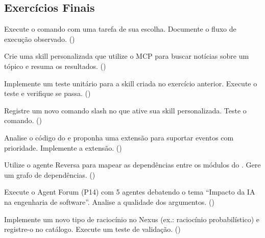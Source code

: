 \subsection{Exercícios Finais}
\label{subsec:exercicios-finais}

\begin{exercicio}
Execute o comando  com uma tarefa de sua escolha.
Documente o fluxo de execução observado. (\nivelzero)
\end{exercicio}

\begin{exercicio}
Crie uma skill personalizada que utilize o MCP  para
buscar notícias sobre um tópico e resuma os resultados.
(\nivelbasico)
\end{exercicio}

\begin{exercicio}
Implemente um teste unitário para a skill criada no exercício anterior.
Execute o teste e verifique se passa. (\nivelintermediario)
\end{exercicio}

\begin{exercicio}
Registre um novo comando slash no  que ative sua
skill personalizada. Teste o comando. (\nivelintermediario)
\end{exercicio}

\begin{exercicio}
Analise o código do  e proponha uma extensão para
suportar eventos com prioridade. Implemente a extensão.
(\nivelavancado)
\end{exercicio}

\begin{exercicio}
Utilize o agente Reversa  para mapear
as dependências entre os módulos do . Gere um grafo de
dependências. (\nivelavancado)
\end{exercicio}

\begin{exercicio}
Execute o Agent Forum (P14) com 5 agentes debatendo o tema
``Impacto da IA na engenharia de software''. Analise a qualidade dos
argumentos. (\nivelphd)
\end{exercicio}

\begin{exercicio}
Implemente um novo tipo de raciocínio no Nexus (ex.: raciocínio
probabilístico) e registre-o no catálogo. Execute um teste de
validação. (\nivelphd)
\end{exercicio}

